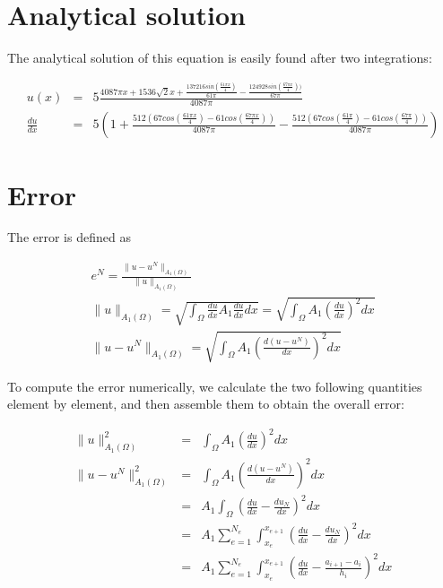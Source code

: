 \documentclass[paper=a4, fontsize=11pt]{article} %
\begin{document}
\section{Analytical solution}
The analytical solution of this equation is easily found after two integrations:

\begin{eqnarray}
u(x)&=& 5\frac{4087\pi x + 1536\sqrt{2}x + \frac{137216sin(\frac{61\pi x}{4})}{61\pi}- \frac{124928sin(\frac{67\pi x}{4}))}{67\pi}}{4087\pi}\nonumber\\
\frac{du}{dx}&=& 5(1+ \frac{512(67cos(\frac{61\pi x}{4})- 61cos(\frac{67\pi x}{4}))}{4087\pi} - \frac{512(67cos(\frac{61\pi }{4})- 61cos(\frac{67\pi}{4}))}{4087\pi})
\end{eqnarray}


\section{Error}
The error is defined as 

\begin{eqnarray}
e^N = \frac{\| u -u^N \| _{A_1(\Omega)}} {\| u \| _{A_1 (\Omega)}} \nonumber\\
\| u \| _{A_1 (\Omega)} = \sqrt{\int_{\Omega} \frac{du}{dx} A_1 \frac{du}{dx} dx} = \sqrt{\int_{\Omega} A_1(\frac{du}{dx})^2 dx}\nonumber\\
\| u -u^N \| _{A_1(\Omega)} = \sqrt{\int_{\Omega} A_1 (\frac{d(u-u^N)}{dx})^2 dx}
\end{eqnarray}

To compute the error numerically, we calculate the two following quantities element by element, and then assemble them to obtain the overall error:

\begin{eqnarray}
\| u \| _{A_1 (\Omega)}^2 &=&\int_{\Omega} A_1(\frac{du}{dx})^2 dx\nonumber\\
\| u -u^N \| _{A_1(\Omega)} ^2 &=& \int_{\Omega} A_1 (\frac{d(u-u^N)}{dx})^2 dx\nonumber\\
&=& A_1 \int_{\Omega} (\frac{du}{dx} - \frac{du_N}{dx})^2 dx\nonumber\\
&=& A_1 \sum_{e=1}^{N_e} \int_{x_e}^{x_{e+1}} (\frac{du}{dx} - \frac{du_N}{dx})^2 dx \nonumber\\
&=& A_1 \sum_{e=1}^{N_e} \int_{x_e}^{x_{e+1}} (\frac{du}{dx} - \frac{a_{i+1}-a_i}{h_i})^2 dx
\end{eqnarray}
\end{document}
